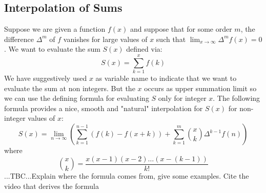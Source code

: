 





\subsection{Interpolation of Sums}
Suppose we are given a function $f(x)$ and suppose that for some order $m$, the difference $\Delta^m$ of $f$ vanishes for large values of $x$ such that $\lim_{x \rightarrow \infty} \Delta^m f(x) = 0$. We want to evaluate the sum $S(x)$ defined via:
\begin{equation}
S(x) = \sum_{k=1}^{x} f(k)
\end{equation}
We have suggestively used $x$ as variable name to indicate that we want to evaluate the sum at non integers. But the $x$ occurs as upper summation limit so we can use the defining formula for evaluating $S$ only for integer $x$. The following formula provides a nice, smooth and "natural" interpolation for $S(x)$ for non-integer values of $x$:
\begin{equation}
S(x) = \lim_{n \rightarrow \infty} 
\left(   \sum_{k=1}^{n-1} \left(f(k) - f(x+k) \right) 
       + \sum_{k=1}^{m} \binom{x}{k} \Delta^{k-1} f(n)  \right)
\end{equation}
where
\begin{equation}
\binom{x}{k} = \frac{x (x-1) (x-2) \ldots (x-(k-1)) }{k!}
\end{equation}
...TBC...Explain where the formula comes from, give some examples. Cite the video that derives the formula



